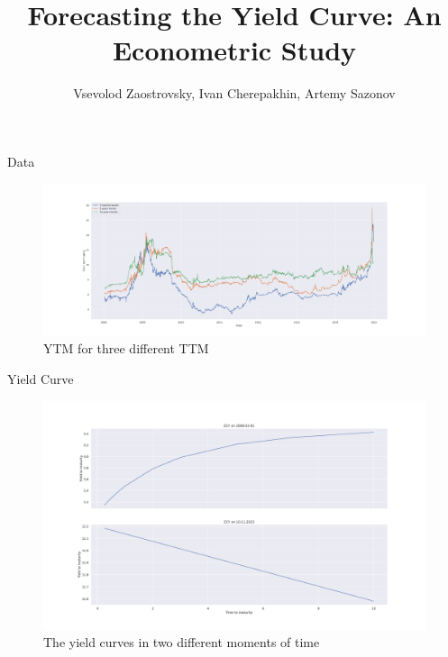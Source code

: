 \documentclass[aspectratio=169]{beamer}
\title{Forecasting the Yield Curve: An Econometric Study}
\subtitle{}
\author{Vsevolod Zaostrovsky, Ivan Cherepakhin, Artemy Sazonov}
\institute{Lomonosov Moscow State University}
\begin{document}
\maketitle

\begin{frame}{Data}
    \begin{figure}
        \includegraphics[scale=0.21]{fig/YTMp.pdf}
        \caption{YTM for three different TTM}
        \label{fig:YTMp}
    \end{figure}
\end{frame}

    \begin{frame}{Yield Curve}
        \begin{figure}
            \includegraphics[scale=0.21]{fig/ZCYp.pdf}
            \caption{The yield curves in two different moments of time}
            \label{fig:ZCY}
        \end{figure}
    \end{frame}
\end{document}

